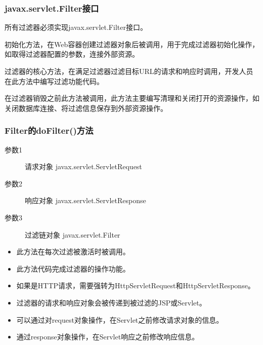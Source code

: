 \begin{frame}[fragile] %
\frametitle{javax.servlet.Filter接口} 

所有过滤器必须实现javax.servlet.Filter接口。


初始化方法，在Web容器创建过滤器对象后被调用，用于完成过滤器初始化操作，如取得过滤器配置的参数，连接外部资源。


过滤器的核心方法，在满足过滤器过滤目标URL的请求和响应时调用，开发人员在此方法中编写过滤功能代码。


在过滤器销毁之前此方法被调用，此方法主要编写清理和关闭打开的资源操作，如关闭数据库连接、将过滤信息保存到外部资源操作。
\end{frame}

\begin{frame}[fragile] %
\frametitle{Filter的doFilter()方法} 

\begin{description}
\item[参数1] 请求对象 javax.servlet.ServletRequest
\item[参数2] 响应对象 javax.servlet.ServletResponse
\item[参数3] 过滤链对象 javax.servlet.Filter
\end{description}

\begin{itemize}
\item 此方法在每次过滤被激活时被调用。
\item 此方法代码完成过滤器的操作功能。
\item 如果是HTTP请求，需要强转为HttpServletRequest和HttpServletResponse。
\item 过滤器的请求和响应对象会被传递到被过滤的JSP或Servlet。
\item 可以通过对request对象操作，在Servlet之前修改请求对象的信息。
\item 通过response对象操作，在Servlet响应之前修改响应信息。
\end{itemize}
\end{frame}



